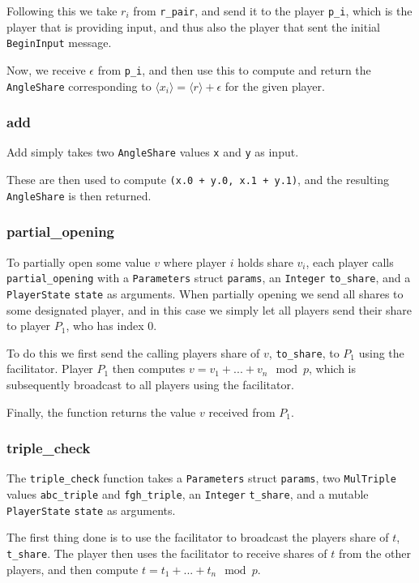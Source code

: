 \documentclass[../main.tex]{subfiles}
\begin{document}
Following this we take $r_i$ from \lstinline{r_pair}, and send it to the player \lstinline{p_i}, which is the player that is providing input, and thus also the player that sent the initial \lstinline{BeginInput} message.

Now, we receive $\epsilon$ from \lstinline{p_i}, and then use this to compute and return the \lstinline{AngleShare} corresponding to $\langle x_i \rangle = \langle r \rangle + \epsilon$ for the given player.

\subsubsection{add}
Add simply takes two \lstinline{AngleShare} values \lstinline{x} and \lstinline{y} as input.

These are then used to compute \lstinline{(x.0 + y.0, x.1 + y.1)}, and the resulting \lstinline{AngleShare} is then returned.
\subsubsection{partial\_opening}
To partially open some value $v$ where player $i$ holds share $v_i$, each player calls \lstinline{partial_opening} with a \lstinline{Parameters} struct \lstinline{params}, an \lstinline{Integer} \lstinline{to_share}, and a \lstinline{PlayerState}  \lstinline{state} as arguments. When partially opening we send all shares to some designated player, and in this case we simply let all players send their share to player $P_1$, who has index $0$.

To do this we first send the calling players share of $v$, \lstinline{to_share}, to $P_1$ using the facilitator. Player $P_1$ then computes $v = v_1 + ... + v_n \mod p$, which is subsequently broadcast to all players using the facilitator.

Finally, the function returns the value $v$ received from $P_1$.

\subsubsection{triple\_check}
The \lstinline{triple_check} function takes a \lstinline{Parameters} struct \lstinline{params}, two \lstinline{MulTriple} values \lstinline{abc_triple} and \lstinline{fgh_triple}, an \lstinline{Integer} \lstinline{t_share}, and a mutable \lstinline{PlayerState} \lstinline{state} as arguments.

The first thing done is to use the facilitator to broadcast the players share of $t$, \lstinline{t_share}. The player then uses the facilitator to receive shares of $t$ from the other players, and then compute $t = t_1 + ... + t_n \mod p$.
\end{document}
